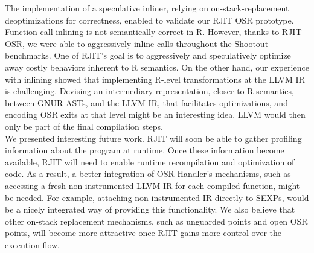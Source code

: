 The implementation of a speculative inliner, relying on on-stack-replacement deoptimizations for correctness, enabled to validate our RJIT OSR prototype. 
Function call inlining is not semantically correct in R.
However, thanks to RJIT OSR, we were able to aggressively inline calls throughout the Shootout benchmarks\cite{Shootout}.
One of RJIT's goal is to aggressively and speculatively optimize away costly behaviors inherent to R semantics.
On the other hand, our experience with inlining showed that implementing R-level transformations at the LLVM IR is challenging.
Devising an intermediary representation, closer to R semantics, between GNUR ASTs, and the LLVM IR, that facilitates optimizations, and encoding OSR exits at that level might be an interesting idea.
LLVM would then only be part of the final compilation steps.\\

We presented interesting future work.
RJIT will soon be able to gather profiling information about the program at runtime. 
Once these information become available, RJIT will need to enable runtime recompilation and optimization of code.
As a result, a better integration of OSR Handler's mechanisms, such as accessing a fresh non-instrumented LLVM IR for each compiled function, might be needed. 
For example, attaching non-instrumented IR directly to SEXPs, would be a nicely integrated way of providing this functionality.
We also believe that other on-stack replacement mechanisms, such as unguarded points and open OSR points, will become more attractive once RJIT gains more control over the execution flow.\\